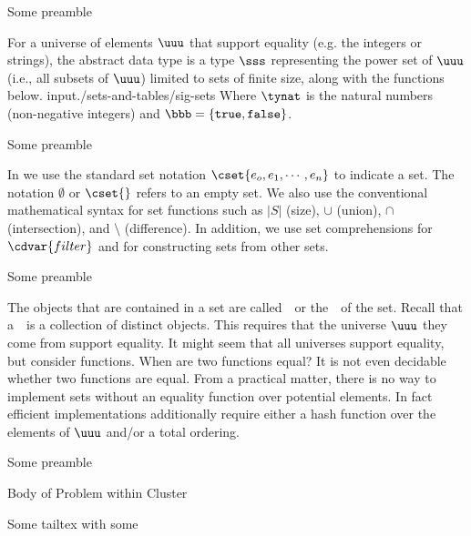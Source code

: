 Some preamble \somecommand
\begin{cluster}
\begin{datatype}[Sets]
\label{XXadt:sets} 
For a universe of elements $\uuu$ that support equality (e.g. the integers or strings), the 
 abstract data type is a type $\sss$ representing the power 
set of $\uuu$ (i.e., all subsets of $\uuu$) limited to sets of finite 
size, along with the functions below. 
{\normalsize
input{./sets-and-tables/sig-sets}
}
Where $\tynat$ is 
the natural numbers (non-negative integers) and $\bbb = \{\texttt{true},
\texttt{false}\}$.

\end{datatype}

Some preamble \somecommand
\begin{syntax}[Sets] 
\label{XXsyn:sets}
In \pml{}  we use the standard set notation $\cset{e_o,e_1,\cdots,e_n}$ to
  indicate a set.  The notation $\emptyset$ or $\cset{}$ refers to an
  empty set. We also use the conventional mathematical syntax for set
  functions such as $|S|$ (size), $\cup$ (union), $\cap$
  (intersection), and $\setminus$ (difference).  In addition, we use
  set comprehensions for $\cdvar{filter}$ and for constructing sets from
  other sets.
\end{syntax}

Some preamble \somecommand
\begin{gram}
  The objects that are contained in a set are called~~or the~~of the set.  Recall that a~~is a collection of distinct objects.  This requires that
  the universe $\uuu$ they come from support equality.  It might seem that
  all universes support equality, but consider functions.  When are
  two functions equal?   It is not even decidable whether two
  functions are equal.   From a practical matter, there is no way to
  implement sets without an equality function over potential
  elements.   In fact efficient implementations additionally require
  either a hash function over the elements of $\uuu$ and/or a total ordering.
\end{gram}

Some preamble \somecommand
\begin{problem}
Body of Problem within Cluster
\end{problem}

Some tailtex with some \command

\end{cluster}

